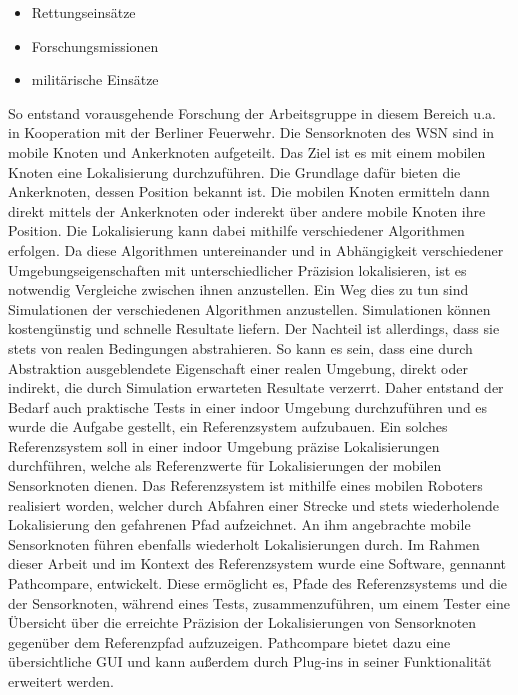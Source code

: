 \begin{itemize}
  \item Rettungseinsätze 
  \item Forschungsmissionen
  \item militärische Einsätze
\end{itemize}

So entstand vorausgehende Forschung der Arbeitsgruppe in diesem Bereich u.a. in
Kooperation mit der Berliner Feuerwehr. Die Sensorknoten des WSN sind in mobile
Knoten und Ankerknoten aufgeteilt. Das Ziel ist es mit einem mobilen Knoten
eine Lokalisierung durchzuführen. Die Grundlage dafür bieten die Ankerknoten,
dessen Position bekannt ist. Die mobilen Knoten ermitteln dann direkt mittels
der Ankerknoten oder inderekt über andere mobile Knoten ihre Position. Die
Lokalisierung kann dabei mithilfe verschiedener Algorithmen erfolgen. Da diese
Algorithmen untereinander und in Abhängigkeit verschiedener
Umgebungseigenschaften mit unterschiedlicher Präzision lokalisieren, ist es
notwendig Vergleiche zwischen ihnen anzustellen. Ein Weg dies zu tun sind
Simulationen der verschiedenen Algorithmen anzustellen. Simulationen können
kostengünstig und schnelle Resultate liefern. Der Nachteil ist allerdings, dass
sie stets von realen Bedingungen abstrahieren. So kann es sein, dass eine durch
Abstraktion ausgeblendete Eigenschaft einer realen Umgebung, direkt oder
indirekt, die durch Simulation erwarteten Resultate verzerrt. Daher entstand
der Bedarf auch praktische Tests in einer indoor Umgebung durchzuführen und es
wurde die Aufgabe gestellt, ein Referenzsystem aufzubauen. Ein solches
Referenzsystem soll in einer indoor Umgebung präzise Lokalisierungen
durchführen, welche als Referenzwerte für Lokalisierungen der mobilen
Sensorknoten dienen. Das Referenzsystem ist mithilfe eines mobilen Roboters
realisiert worden, welcher durch Abfahren einer Strecke und stets wiederholende
Lokalisierung den gefahrenen Pfad aufzeichnet.  An ihm angebrachte mobile
Sensorknoten führen ebenfalls wiederholt Lokalisierungen durch. Im Rahmen
dieser Arbeit und im Kontext des Referenzsystem wurde eine Software, gennannt
Pathcompare, entwickelt.  Diese ermöglicht es, Pfade des Referenzsystems und
die der Sensorknoten, während eines Tests, zusammenzuführen, um einem Tester
eine Übersicht über die erreichte Präzision der Lokalisierungen von
Sensorknoten gegenüber dem Referenzpfad aufzuzeigen. Pathcompare bietet dazu
eine übersichtliche GUI und kann außerdem durch Plug-ins in seiner Funktionalität
erweitert werden.

